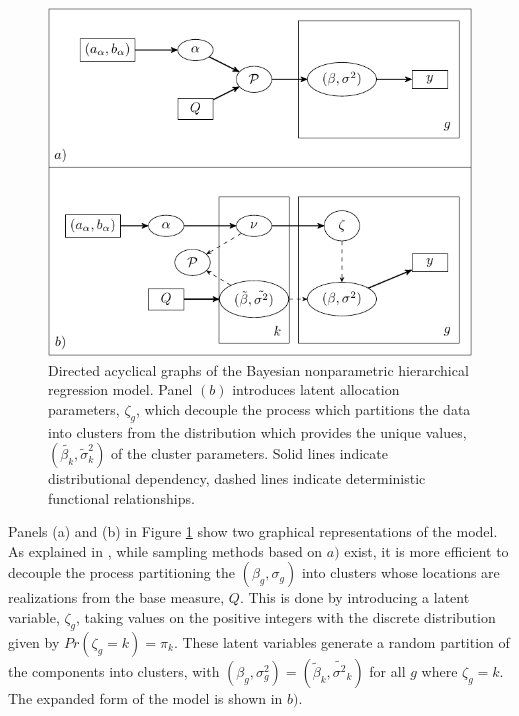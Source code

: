 {\begin{figure}
\includegraphics[width=.8\textwidth]{my_dag}
\caption{\small Directed acyclical graphs of the Bayesian nonparametric hierarchical regression model. Panel $(b)$ introduces latent allocation parameters, $\zeta_g$, which decouple the process which partitions the data into clusters from the distribution which provides the unique values, $(\tilde{\beta_k},\tilde{\sigma}_k^2)$ of the cluster parameters. Solid lines indicate distributional dependency, dashed lines indicate deterministic functional relationships.}
\label{dag}
\end{figure}

Panels (a) and (b) in Figure \ref{dag} show two graphical representations of the model. As explained in \cite{neal2000}, while sampling methods based on $a)$ exist, it is more efficient to decouple the process partitioning the $(\beta_g,\sigma_g)$ into clusters whose locations are realizations from the base measure, $Q$. This is done by introducing a latent variable, $\zeta_g$, taking values on the positive integers with the discrete distribution given by $Pr(\zeta_g=k)=\pi_k$. These latent variables generate a random partition of the components into clusters, with $(\beta_g,\sigma^2_g)=(\tilde{\beta}_k,\tilde{\sigma^2}_k)$ for all $g$ where $\zeta_g=k$. The expanded form of the model is shown in $b)$.

}
